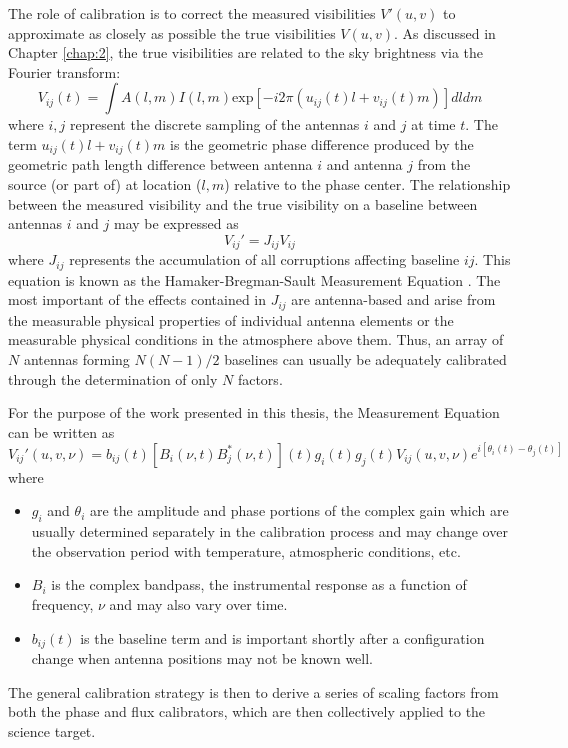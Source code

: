 The role of calibration is to correct the measured visibilities $V'(u,v)$ to approximate as closely as possible the true visibilities $V(u,v)$. As discussed in Chapter \ref{chap:2}, the true visibilities are related to the sky brightness via the Fourier transform:
\begin{equation}
V_{ij}(t) = \int A(l,m) I(l,m) \mathrm{exp}[-i2\pi(u_{ij}(t)l + v_{ij}(t)m)]	dl	dm 
\end{equation}
where $i,j$ represent the discrete sampling of the antennas $i$ and $j$ at time $t$. The term $u_{ij}(t)l + v_{ij}(t)m$ is the geometric phase difference produced by the geometric path length difference between antenna $i$ and antenna $j$ from the source (or part of) at location ($l,m$) relative to the phase center. The relationship between the measured visibility and the true visibility on a baseline between antennas $i$ and $j$ may be expressed as
\begin{equation}
V_{ij}' =  J_{ij}V_{ij}
\end{equation}
where $ J_{ij}$ represents the accumulation of all corruptions affecting baseline $ij$. This equation is known as the Hamaker-Bregman-Sault Measurement Equation \citep{hamaker_1996}. The most important of the effects contained in $J_{ij}$ are antenna-based and arise from the measurable physical properties of individual antenna elements or the measurable physical conditions in the atmosphere above them. Thus, an array of $N$ antennas forming $N(N-1)/2$ baselines can usually be adequately calibrated through the determination of only $N$ factors.

For the purpose of the work presented in this thesis, the Measurement Equation can be written as
\begin{equation}
V_{ij}'(u,v,\nu) = b_{ij}(t)[B_{i}(\nu ,t)B_{j}^{*}(\nu ,t)](t)g_{i}(t)g_{j}(t)V_{ij}(u,v,\nu)e^{i[\theta _{i}(t) - \theta _{j}(t)]}
\end{equation}
where
\begin{itemize}
\item $g_{i}$ and $\theta _{i}$ are the amplitude and phase portions of the complex gain which are usually determined separately in the calibration process and may change over the observation period with temperature, atmospheric conditions, etc. 
\item $B_{i}$ is the complex bandpass, the instrumental response as a function of frequency, $\nu$ and may also vary over time.
\item $b_{ij}(t)$ is the baseline term and is important shortly after a configuration change when antenna positions may not be known well.
\end{itemize}
The general calibration strategy is then to derive a series of scaling factors from both the phase and flux calibrators, which are then collectively applied to the science target. 

